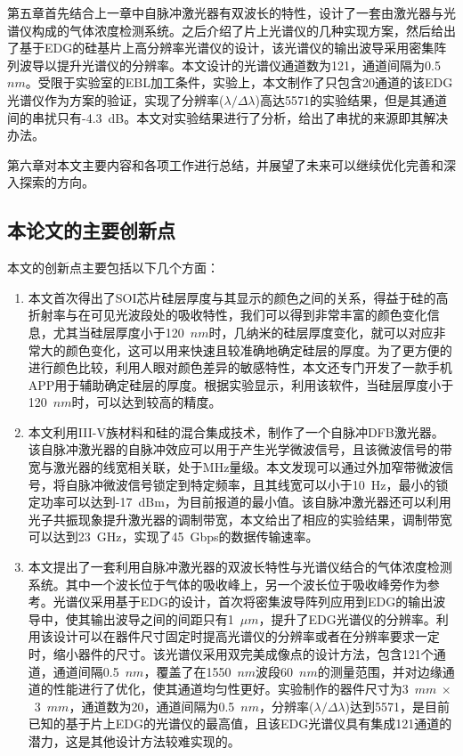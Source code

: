 第五章首先结合上一章中自脉冲激光器有双波长的特性，设计了一套由激光器与光谱仪构成的气体浓度检测系统。之后介绍了片上光谱仪的几种实现方案，然后给出了基于EDG的硅基片上高分辨率光谱仪的设计，该光谱仪的输出波导采用密集阵列波导以提升光谱仪的分辨率。本文设计的光谱仪通道数为121，通道间隔为0.5~$nm$。受限于实验室的EBL加工条件，实验上，本文制作了只包含20通道的该EDG光谱仪作为方案的验证，实现了分辨率($\lambda/\Delta\lambda$)高达5571的实验结果，但是其通道间的串扰只有-4.3~dB。本文对实验结果进行了分析，给出了串扰的来源即其解决办法。

第六章对本文主要内容和各项工作进行总结，并展望了未来可以继续优化完善和深入探索的方向。

\subsection{本论文的主要创新点}
本文的创新点主要包括以下几个方面：

\begin{enumerate}[(1)]
	\item 
	本文首次得出了SOI芯片硅层厚度与其显示的颜色之间的关系，得益于硅的高折射率与在可见光波段处的吸收特性，我们可以得到非常丰富的颜色变化信息，尤其当硅层厚度小于120~$nm$时，几纳米的硅层厚度变化，就可以对应非常大的颜色变化，这可以用来快速且较准确地确定硅层的厚度。为了更方便的进行颜色比较，利用人眼对颜色差异的敏感特性，本文还专门开发了一款手机APP用于辅助确定硅层的厚度。根据实验显示，利用该软件，当硅层厚度小于120~$nm$时，可以达到较高的精度。
	\item 
	本文利用III-V族材料和硅的混合集成技术，制作了一个自脉冲DFB激光器。该自脉冲激光器的自脉冲效应可以用于产生光学微波信号，且该微波信号的带宽与激光器的线宽相关联，处于MHz量级。本文发现可以通过外加窄带微波信号，将自脉冲微波信号锁定到特定频率，且其线宽可以小于10~Hz，最小的锁定功率可以达到-17~dBm，为目前报道的最小值。该自脉冲激光器还可以利用光子共振现象提升激光器的调制带宽，本文给出了相应的实验结果，调制带宽可以达到23~GHz，实现了45~Gbps的数据传输速率。
	\item 
	本文提出了一套利用自脉冲激光器的双波长特性与光谱仪结合的气体浓度检测系统。其中一个波长位于气体的吸收峰上，另一个波长位于吸收峰旁作为参考。光谱仪采用基于EDG的设计，首次将密集波导阵列应用到EDG的输出波导中，使其输出波导之间的间距只有1~$\mu m$，提升了EDG光谱仪的分辨率。利用该设计可以在器件尺寸固定时提高光谱仪的分辨率或者在分辨率要求一定时，缩小器件的尺寸。该光谱仪采用双完美成像点的设计方法，包含121个通道，通道间隔0.5~$nm$，覆盖了在1550~$nm$波段60~$nm$的测量范围，并对边缘通道的性能进行了优化，使其通道均匀性更好。实验制作的器件尺寸为3~$mm~\times$~3~$mm$，通道数为20，通道间隔为0.5~$nm$，分辨率($\lambda/\Delta\lambda$)达到5571，是目前已知的基于片上EDG的光谱仪的最高值，且该EDG光谱仪具有集成121通道的潜力，这是其他设计方法较难实现的。
	\end{enumerate}

